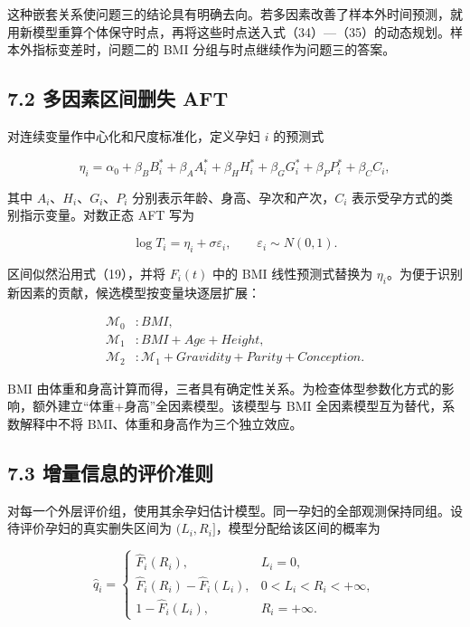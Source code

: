 \documentclass[UTF8,fontset=fandol,zihao=-4,a4paper]{ctexart}
\begin{document}
这种嵌套关系使问题三的结论具有明确去向。若多因素改善了样本外时间预测，就用新模型重算个体保守时点，再将这些时点送入式（34）---（35）的动态规划。样本外指标变差时，问题二的
BMI 分组与时点继续作为问题三的答案。

\subsection{7.2 多因素区间删失
AFT}\label{ux591aux56e0ux7d20ux533aux95f4ux5220ux5931-aft}

对连续变量作中心化和尺度标准化，定义孕妇 \(i\) 的预测式

\[
\eta_i
=\alpha_0+\beta_BB_i^*
+\beta_AA_i^*
+\beta_HH_i^*
+\beta_GG_i^*
+\beta_PP_i^*
+\beta_CC_i,
\tag{37}
\]

其中 \(A_i\)、\(H_i\)、\(G_i\)、\(P_i\)
分别表示年龄、身高、孕次和产次，\(C_i\)
表示受孕方式的类别指示变量。对数正态 AFT 写为

\[
\log T_i=\eta_i+\sigma\varepsilon_i,
\qquad \varepsilon_i\sim N(0,1).
\tag{38}
\]

区间似然沿用式（19），并将 \(F_i(t)\) 中的 BMI 线性预测式替换为
\(\eta_i\)。为便于识别新因素的贡献，候选模型按变量块逐层扩展：

\[
\begin{aligned}
\mathcal M_0 &: BMI,\\
\mathcal M_1 &: BMI+Age+Height,\\
\mathcal M_2 &: \mathcal M_1+Gravidity+Parity+Conception.
\end{aligned}
\tag{39}
\]

BMI
由体重和身高计算而得，三者具有确定性关系。为检查体型参数化方式的影响，额外建立``体重+身高''全因素模型。该模型与
BMI 全因素模型互为替代，系数解释中不将 BMI、体重和身高作为三个独立效应。

\subsection{7.3
增量信息的评价准则}\label{ux589eux91cfux4fe1ux606fux7684ux8bc4ux4ef7ux51c6ux5219}

对每一个外层评价组，使用其余孕妇估计模型。同一孕妇的全部观测保持同组。设待评价孕妇的真实删失区间为
\((L_i,R_i]\)，模型分配给该区间的概率为

\[
\widehat q_i=
\begin{cases}
\widehat F_i(R_i), & L_i=0,\\
\widehat F_i(R_i)-\widehat F_i(L_i), & 0<L_i<R_i<+\infty,\\
1-\widehat F_i(L_i), & R_i=+\infty.
\end{cases}
\tag{40}
\]
\end{document}
